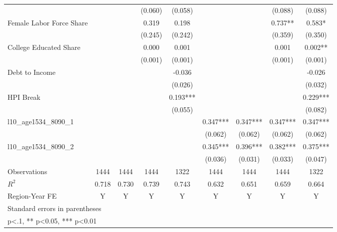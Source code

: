 \begin{table}[htbp]
\begin{tabular}{l*{8}{c}}
                    &            &            &  (0.060)   &  (0.058)   &            &            &  (0.088)   &  (0.088)   \\
\addlinespace
Female Labor Force Share&            &            &    0.319   &    0.198   &            &            &    0.737** &    0.583*  \\
                    &            &            &  (0.245)   &  (0.242)   &            &            &  (0.359)   &  (0.350)   \\
\addlinespace
College Educated Share&            &            &    0.000   &    0.001   &            &            &    0.001   &    0.002** \\
                    &            &            &  (0.001)   &  (0.001)   &            &            &  (0.001)   &  (0.001)   \\
\addlinespace
Debt to Income      &            &            &            &   -0.036   &            &            &            &   -0.026   \\
                    &            &            &            &  (0.026)   &            &            &            &  (0.032)   \\
\addlinespace
HPI Break           &            &            &            &    0.193***&            &            &            &    0.229***\\
                    &            &            &            &  (0.055)   &            &            &            &  (0.082)   \\
\addlinespace
l10\_age1534\_8090\_1  &            &            &            &            &    0.347***&    0.347***&    0.347***&    0.347***\\
                    &            &            &            &            &  (0.062)   &  (0.062)   &  (0.062)   &  (0.062)   \\
\addlinespace
l10\_age1534\_8090\_2  &            &            &            &            &    0.345***&    0.396***&    0.382***&    0.375***\\
                    &            &            &            &            &  (0.036)   &  (0.031)   &  (0.033)   &  (0.047)   \\
\midrule
Observations        &     1444   &     1444   &     1444   &     1322   &     1444   &     1444   &     1444   &     1322   \\
\(R^{2}\)           &    0.718   &    0.730   &    0.739   &    0.743   &    0.632   &    0.651   &    0.659   &    0.664   \\
Region-Year FE      &        Y   &        Y   &        Y   &        Y   &        Y   &        Y   &        Y   &        Y   \\
\bottomrule
\multicolumn{9}{l}{\footnotesize Standard errors in parentheses}\\
\multicolumn{9}{l}{\footnotesize * p<.1, ** p<0.05, *** p<0.01}\\
\end{tabular}
\end{table}
